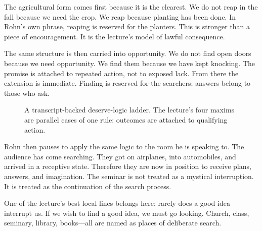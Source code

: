 The agricultural form comes first because it is the clearest. We do not reap in the fall because we need the crop. We reap because planting has been done. In Rohn's own phrase, reaping is reserved for the planters. This is stronger than a piece of encouragement. It is the lecture's model of lawful consequence.

The same structure is then carried into opportunity. We do not find open doors because we need opportunity. We find them because we have kept knocking. The promise is attached to repeated action, not to exposed lack. From there the extension is immediate. Finding is reserved for the searchers; answers belong to those who ask.

\begin{figure}[t]
\centering
{}
\caption{A transcript-backed deserve-logic ladder. The lecture's four maxims are parallel cases of one rule: outcomes are attached to qualifying action.}
\end{figure}

Rohn then pauses to apply the same logic to the room he is speaking to. The audience has come searching. They got on airplanes, into automobiles, and arrived in a receptive state. Therefore they are now in position to receive plans, answers, and imagination. The seminar is not treated as a mystical interruption. It is treated as the continuation of the search process.

One of the lecture's best local lines belongs here: rarely does a good idea interrupt us. If we wish to find a good idea, we must go looking. Church, class, seminary, library, books---all are named as places of deliberate search.

